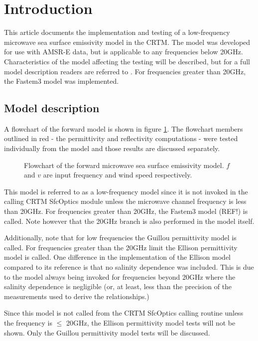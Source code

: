 \section{Introduction}
This article documents the implementation and testing of a low-frequency microwave sea surface emissivity model in the CRTM. The model was developed for use with AMSR-E data, but is applicable to any frequencies below 20GHz. Characteristics of the model affecting the testing will be described, but for a full model description readers are referred to \citet{Kazumori_2008}. For frequencies greater than 20GHz, the Fastem3 model was implemented.

\subsection{Model description}
\label{sec:model_description}
A flowchart of the forward model is shown in figure \ref{fig:main_flowchart}. The flowchart members outlined in red - the permittivity and reflectivity computations - were tested individually from the model and those results are discussed separately.
\begin{figure}[htp]
  \centering
  
  \caption{Flowchart of the forward microwave sea surface emissivity model. $f$ and $v$ are input frequency and wind speed respectively.}
  \label{fig:main_flowchart}
\end{figure}
This model is referred to as a low-frequency model since it is not invoked in the calling CRTM SfcOptics module unless the microwave channel frequency is less than 20GHz. For frequencies greater than 20GHz, the Fastem3 model (REF!) is called. Note however that the 20GHz branch is also performed in the model itself.

Additionally, note that for low frequencies the Guillou permittivity model \citep{Guillou_1998} is called. For frequencies greater than the 20GHz limit the Ellison permittivity model \citep{Ellison_2003} is called. One difference in the implementation of the Ellison model compared to its reference is that no salinity dependence was included. This is due to the model always being invoked for frequencies beyond 20GHz where the salinity dependence is negligible (or, at least, less than the precision of the measurements used to derive the relationships.)

Since this model is not called from the CRTM SfcOptics calling routine unless the frequency is $\le$ 20GHz, the Ellison permittivity model tests will not be shown. Only the Guillou permittivity model tests will be discussed.

